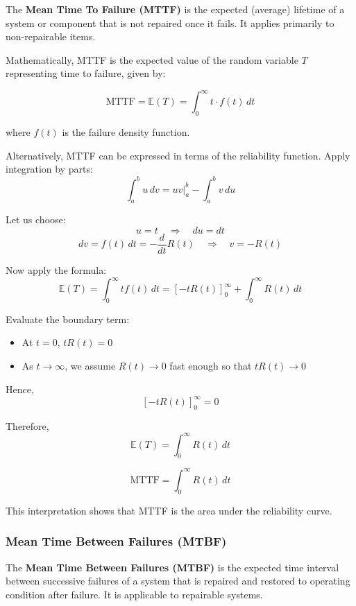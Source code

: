 \documentclass[twoside]{book}
\begin{document}
\begin{textbox}
The \textbf{Mean Time To Failure (MTTF)} is the expected (average) lifetime of a system or component that is not repaired once it fails. It applies primarily to non-repairable items.
\end{textbox}

Mathematically, MTTF is the expected value of the random variable $T$ representing time to failure, given by:

\begin{textbox}
\[
\text{MTTF} = \mathbb{E}(T) = \int_0^{\infty} t \cdot f(t) \, dt
\]
\end{textbox}

where $f(t)$ is the failure density function.

Alternatively, MTTF can be expressed in terms of the reliability function. Apply integration by parts:
\[
\int_a^b u\, dv = uv \big|_a^b - \int_a^b v\, du
\]

Let us choose:
\[
u = t \quad \Rightarrow \quad du = dt
\]
\[
dv = f(t)\,dt  = -\dfrac{d}{dt} R(t)\quad \Rightarrow \quad v = -R(t)
\]

Now apply the formula:
\[
\mathbb{E}(T) = \int_0^\infty t f(t)\, dt = \left[ -t R(t) \right]_0^\infty + \int_0^\infty R(t)\, dt
\]

Evaluate the boundary term:
\begin{itemize}
    \item At \( t = 0 \), \( t R(t) = 0 \)
    \item As \( t \to \infty \), we assume \( R(t) \to 0 \) fast enough so that \( t R(t) \to 0 \)
\end{itemize}
Hence,
\[
\left[ -t R(t) \right]_0^\infty = 0
\]

Therefore,
$$\mathbb{E}(T) = \int_0^\infty R(t)\, dt$$

\begin{textbox}
\[
\text{MTTF} = \int_0^\infty R(t)\, dt
\]
\end{textbox}

This interpretation shows that MTTF is the area under the reliability curve.

\subsubsection{Mean Time Between Failures (MTBF)}

\begin{textbox}
The \textbf{Mean Time Between Failures (MTBF)} is the expected time interval between successive failures of a system that is repaired and restored to operating condition after failure. It is applicable to repairable systems.
\end{textbox}
\end{document}
